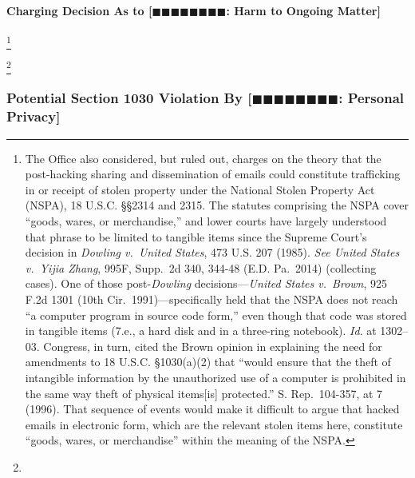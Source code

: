 \paragraph{Charging Decision As to [$\blacksquare\blacksquare\blacksquare\blacksquare\blacksquare\blacksquare\blacksquare\blacksquare$: Harm to Ongoing Matter]}
\footnote{The Office also considered, but ruled out, charges on the theory that the post-hacking sharing and dissemination of emails could constitute trafficking in or receipt of stolen property under the National Stolen Property Act (NSPA), 18 U.S.C. \S\S 2314 and 2315.
The statutes comprising the NSPA cover “goods, wares, or merchandise,” and lower courts have largely understood that phrase to be limited to tangible items since the Supreme Court's decision in \textit{Dowling v.\ United States}, 473 U.S. 207 (1985).
\textit{See United States v.\ Yijia Zhang}, 995F, Supp.~2d 340, 344-48 (E.D. Pa.~2014) (collecting cases).
One of those post-\textit{Dowling} decisions---\textit{United States v.\ Brown}, 925 F.2d 1301 (10th Cir.~1991)---specifically held that the NSPA does not reach “a computer program in source code form,” even though that code was stored in tangible items (7.e., a hard disk and in a three-ring notebook).
\textit{Id}. at 1302--03.
Congress, in turn, cited the Brown opinion in explaining the need for amendments to 18 U.S.C. \S 1030(a)(2) that “would ensure that the theft of intangible information by the unauthorized use of a computer is prohibited in the same way theft of physical items[is] protected.”
S. Rep.~104-357, at 7 (1996).
That sequence of events would make it difficult to argue that hacked emails in electronic form, which are the relevant stolen items here, constitute “goods, wares, or merchandise” within the meaning of the NSPA.}




\footnote{}






\subsubsection{Potential Section 1030 Violation By [$\blacksquare\blacksquare\blacksquare\blacksquare\blacksquare\blacksquare\blacksquare\blacksquare$: Personal Privacy]}

